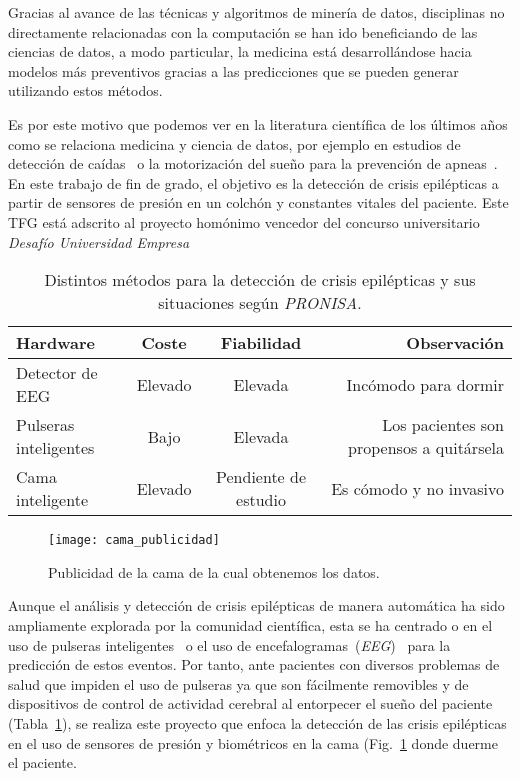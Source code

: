
Gracias al avance de las técnicas y algoritmos de minería de datos, disciplinas no directamente relacionadas con la computación se han ido beneficiando de las ciencias de datos, a modo particular, la medicina está desarrollándose hacia modelos más preventivos gracias a las predicciones que se pueden generar utilizando estos métodos.

Es por este motivo que podemos ver en la literatura científica de los últimos años como se relaciona medicina y ciencia de datos, por ejemplo en estudios de detección de caídas~\cite{tolkiehn2011fall} o la motorización del sueño para la prevención de apneas~\cite{kortelainen2012sleepmonitoring}. En este trabajo de fin de grado, el objetivo es la detección de crisis epilépticas a partir de sensores de presión en un colchón y constantes vitales del paciente. Este TFG está adscrito al proyecto homónimo vencedor del concurso universitario \textit{Desafío Universidad Empresa}~\cite{radio:radio_amiga_burgos_2018}

\begin{table}
	\centering
	\resizebox{\textwidth}{!}
	{\begin{tabular}{|lccr|}
			\hline 
			\textbf{Hardware} & \textbf{Coste} & \textbf{Fiabilidad} & \textbf{Observación} \\ 
			\hline 
			Detector de EEG & Elevado & Elevada & Incómodo para dormir \\ 
			\hline 
			Pulseras inteligentes & Bajo & Elevada & Los pacientes son propensos a quitársela \\ 
			\hline 
			Cama inteligente & Elevado & Pendiente de estudio & Es cómodo y no invasivo \\ 
			\hline 
	\end{tabular}}
	\caption{Distintos métodos para la detección de crisis epilépticas y sus situaciones según \textit{PRONISA}.}
	\label{tab:modelos}
\end{table}

\begin{figure}
	\centering
	\texttt{[image: cama\_publicidad]}
	\caption{Publicidad de la cama de la cual obtenemos los datos.}
	\label{fig:cama_publi}
\end{figure}

Aunque el análisis y detección de crisis epilépticas de manera automática ha sido ampliamente explorada por la comunidad científica, esta se ha centrado o en el uso de pulseras inteligentes~\cite{ramgopal2014product_review} o el uso de encefalogramas~(\textit{EEG})~\cite{jeppesen2017modified,kumar2014epilepticeeg,tzallas2012review} para la predicción de estos eventos. Por tanto, ante pacientes con diversos problemas de salud que impiden el uso de pulseras ya que son fácilmente removibles y de dispositivos de control de actividad cerebral al entorpecer el sueño del paciente (Tabla~\ref{tab:modelos}), se realiza este proyecto que enfoca la detección de las crisis epilépticas en el uso de sensores de presión y biométricos en la cama (Fig.~\ref{fig:cama_publi} donde duerme el paciente. 



